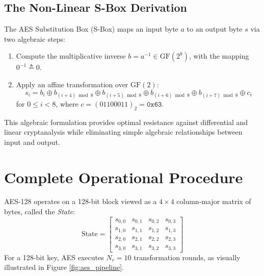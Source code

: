\subsection{The Non-Linear S-Box Derivation}
The AES Substitution Box (S-Box) maps an input byte $a$ to an output byte $s$ via two algebraic steps:
\begin{enumerate}
    \item Compute the multiplicative inverse $b = a^{-1} \in \text{GF}(2^8)$, with the mapping $0^{-1} \triangleq 0$.
    \item Apply an affine transformation over $\text{GF}(2)$:
    \begin{equation}
    s_i = b_i \oplus b_{(i+4)\bmod 8} \oplus b_{(i+5)\bmod 8} \oplus b_{(i+6)\bmod 8} \oplus b_{(i+7)\bmod 8} \oplus c_i
    \end{equation}
    for $0 \le i < 8$, where $c = (01100011)_2 = \texttt{0x63}$.
\end{enumerate}
This algebraic formulation provides optimal resistance against differential and linear cryptanalysis while eliminating simple algebraic relationships between input and output.

\section{Complete Operational Procedure}
AES-128 operates on a 128-bit block viewed as a $4 \times 4$ column-major matrix of bytes, called the \emph{State}:
\begin{equation}
\text{State} = \begin{bmatrix}
s_{0,0} & s_{0,1} & s_{0,2} & s_{0,3} \\
s_{1,0} & s_{1,1} & s_{1,2} & s_{1,3} \\
s_{2,0} & s_{2,1} & s_{2,2} & s_{2,3} \\
s_{3,0} & s_{3,1} & s_{3,2} & s_{3,3}
\end{bmatrix}
\end{equation}
For a 128-bit key, AES executes $N_r = 10$ transformation rounds, as visually illustrated in Figure \ref{fig:aes_pipeline}.

